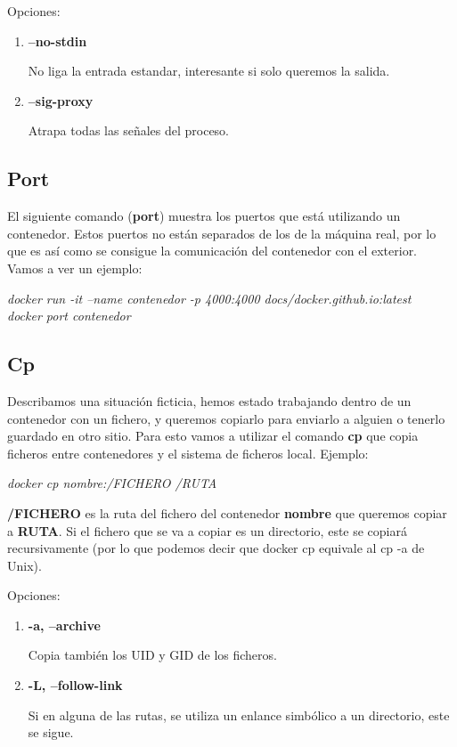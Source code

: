 \documentclass[]{article}
\begin{document}
Opciones:
\begin{enumerate}

\item {\bf --no-stdin}

No liga la entrada estandar, interesante si solo queremos la salida.

\item {\bf --sig-proxy}

	Atrapa todas las señales del proceso.

\end{enumerate}


\subsection{Port}
El siguiente comando ({\bf port}) muestra los puertos que está utilizando un contenedor.
Estos puertos no están separados de los de la máquina real, por lo que es así como se consigue la comunicación del contenedor con el exterior.
Vamos a ver un ejemplo:
\begin{center}
	\it
	docker run -it --name contenedor -p 4000:4000 docs/docker.github.io:latest\\
	docker port contenedor
\end{center}

\subsection{Cp}

Describamos una situación ficticia, hemos estado trabajando dentro de un contenedor con un fichero, y queremos copiarlo para enviarlo a alguien o tenerlo guardado en otro sitio.
Para esto vamos a utilizar el comando {\bf cp} que copia ficheros entre contenedores y el sistema de ficheros local.
Ejemplo:

\begin{center}
\it
docker cp nombre:/FICHERO /RUTA
\end{center}
\textbf{/FICHERO} es la ruta del fichero del contenedor {\bf nombre} que queremos copiar a {\bf RUTA}.
Si el fichero que se va a copiar es un directorio, este se copiará recursivamente (por lo que podemos decir que docker cp equivale al cp -a de Unix).

Opciones:

\begin{enumerate}
	
\renewcommand{\labelenumi}{$ \bullet $}

\item {\bf -a, --archive}

Copia también los UID y GID de los ficheros.

\item {\bf -L, --follow-link}

Si en alguna de las rutas, se utiliza un enlance simbólico a un directorio, este se sigue.

\end{enumerate}
\end{document}
